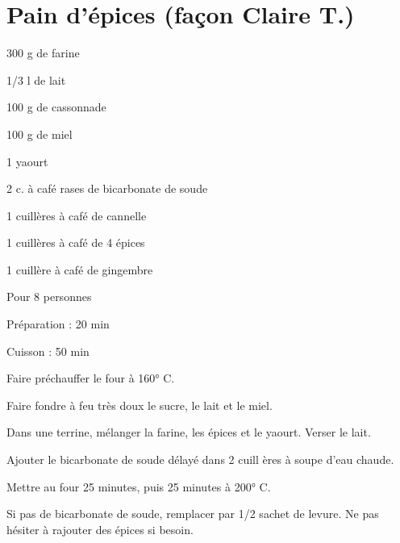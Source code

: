 \section[\normalsize{Pain d'épices (façon Claire T.)}]{Pain d'\'epices (façon Claire T.)}

\begin{ingredients}
\item 300 g de farine
\item 1/3 l de lait
\item 100 g de cassonnade
\item 100 g de miel
\item 1 yaourt
\item 2 c. \`a caf\'e rases de bicarbonate de soude
\item 1 cuill\`eres \`a caf\'e de cannelle
\item 1 cuill\`eres \`a caf\'e de 4 \'epices
\item 1 cuill\`ere \`a caf\'e de gingembre
\end{ingredients}
\begin{infos}
\item Pour 8 personnes
\item Préparation : 20 min
\item Cuisson : 50 min
\end{infos}
\begin{etapes}
\item Faire pr\'echauffer le four \`a 160° C.
\item Faire fondre \`a feu tr\`es doux le sucre, le lait et le 
miel.
\item Dans une terrine, m\'elanger la farine, les \'epices et le 
yaourt. Verser le lait. 
\item Ajouter le bicarbonate de soude d\'elay\'e dans 2 cuill
\`eres \`a soupe d'eau chaude.
\item Mettre au four 25 minutes, puis 25 minutes \`a 200° C.
\end{etapes}
\begin{conseils}
Si pas de bicarbonate de soude, remplacer par 1/2 sachet de levure.
Ne pas h\'esiter \`a rajouter des \'epices si besoin.
\end{conseils}
